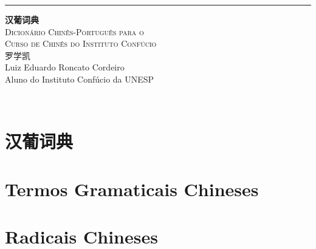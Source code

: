 \documentclass[a4paper,10pt,twoside,openany]{memoir}
\begin{document}
\begin{titlingpage}
  \raggedleft
  \rule{1pt}{\textheight}
  \hspace{0.05\textwidth}
  \parbox[b]{0.75\textwidth}{
    {\Huge\bfseries 汉葡词典}\\[2\baselineskip] %
    {\large\textsc{Dicionário Chinês-Português para o\\%
                   Curso de Chinês do Instituto Confúcio}}\\%
    [4\baselineskip]
    {\Large\textsc{罗学凯}\\%
      \tiny Luiz Eduardo Roncato Cordeiro\\%
            Aluno do Instituto Confúcio da UNESP}

      \vspace{0.5\textheight}

      {\noindent \zhtoday}\\[\baselineskip]
    }
\end{titlingpage}

\newpage
\tableofcontents

\newpage
\chapter{汉葡词典}

%
%
%

\newpage
\begin{multicols}{2}























\end{multicols}

\newpage
\pagestyle{plain}
\chapter{Termos Gramaticais Chineses}


\newpage
\chapter{Radicais Chineses}


\printindex[stroke]
\printindex[radical]
\printindex[pinyin]
\end{document}
